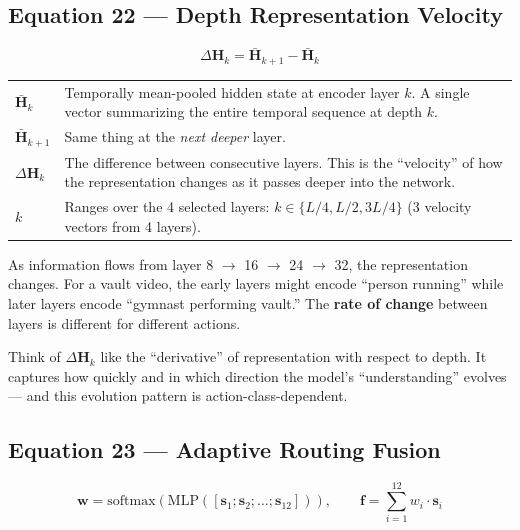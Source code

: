 \documentclass[12pt, a4paper]{article}
\begin{document}
\subsection{Equation 22 --- Depth Representation Velocity}

\begin{eqbox}
\[
\Delta\mathbf{H}_k = \bar{\mathbf{H}}_{k+1} - \bar{\mathbf{H}}_k
\]
\end{eqbox}

\begin{explainbox}
\begin{tabular}{lp{11cm}}
$\bar{\mathbf{H}}_k$ & Temporally mean-pooled hidden state at encoder layer $k$. A single vector summarizing the entire temporal sequence at depth $k$.\\[0.2cm]
$\bar{\mathbf{H}}_{k+1}$ & Same thing at the \textit{next deeper} layer.\\[0.2cm]
$\Delta\mathbf{H}_k$ & The difference between consecutive layers. This is the ``velocity'' of how the representation changes as it passes deeper into the network.\\[0.2cm]
$k$ & Ranges over the 4 selected layers: $k \in \{L/4, L/2, 3L/4\}$ (3 velocity vectors from 4 layers).
\end{tabular}
\end{explainbox}

\begin{analogybox}
As information flows from layer 8 $\rightarrow$ 16 $\rightarrow$ 24 $\rightarrow$ 32, the representation changes. For a vault video, the early layers might encode ``person running'' while later layers encode ``gymnast performing vault.'' The \textbf{rate of change} between layers is different for different actions.

Think of $\Delta\mathbf{H}_k$ like the ``derivative'' of representation with respect to depth. It captures how quickly and in which direction the model's ``understanding'' evolves --- and this evolution pattern is action-class-dependent.
\end{analogybox}


\subsection{Equation 23 --- Adaptive Routing Fusion}

\begin{eqbox}
\[
\mathbf{w} = \text{softmax}\left(\text{MLP}\left([\mathbf{s}_1; \mathbf{s}_2; \ldots; \mathbf{s}_{12}]\right)\right), \qquad
\mathbf{f} = \sum_{i=1}^{12} w_i \cdot \mathbf{s}_i
\]
\end{eqbox}
\end{document}
